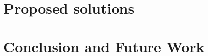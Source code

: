 \documentclass{tudelft-report}
\begin{document}
\chapter{Proposed solutions}\label{cha:4}







\chapter{Conclusion and Future Work}\label{cha:5}


\appendix

%

\printbibliography
\end{document}
